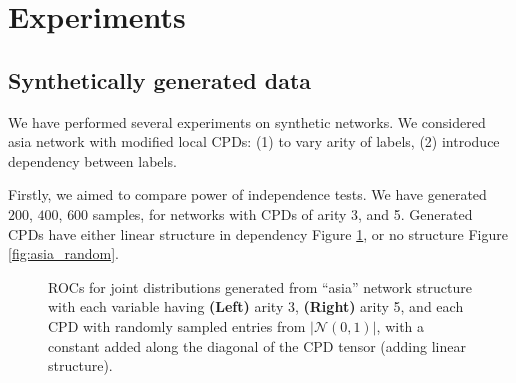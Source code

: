 \documentclass{article} %
\begin{document}
\section{Experiments}


\subsection{Synthetically generated data}
We have performed several experiments on synthetic networks. We considered asia network
with modified local CPDs: (1) to vary arity of labels, (2) introduce dependency between labels.


Firstly, we aimed to compare power of independence tests. We have generated $200$, $400$, $600$
samples, for networks with CPDs of arity 3, and 5. Generated CPDs 
have either linear structure in dependency Figure \ref{fig:asia_linear}, or no structure Figure \ref{fig:asia_random}.

\begin{figure}[h]
\centering
    \quad
\caption{ROCs for joint distributions generated from ``asia'' network structure with each variable having {\bf (Left)} arity 3, {\bf (Right)} arity 5, and each CPD with randomly sampled entries from $|\mathcal{N}(0, 1)|$, with a constant added along the diagonal of the CPD tensor (adding linear structure).}
\label{fig:asia_linear}
\end{figure}
\end{document}

